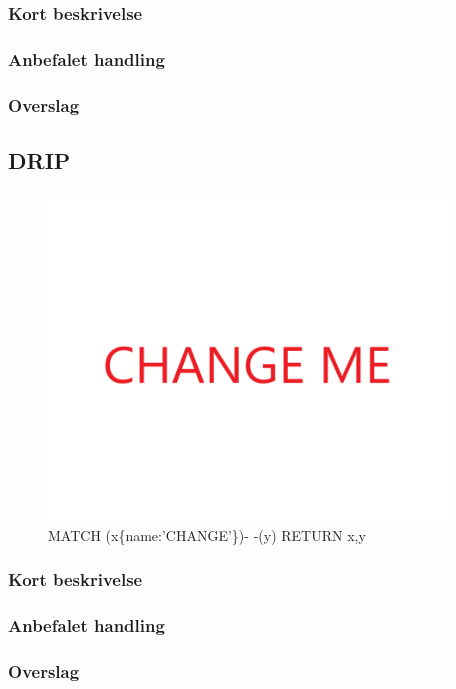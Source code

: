 \documentclass{article}
\begin{document}
\subsubsection{Kort beskrivelse}
\subsubsection{Anbefalet handling}
\subsubsection{Overslag}


\subsection{DRIP}
\begin{figure}[h]
\includegraphics[width=300pt]{CHANGE.PNG}
\caption{MATCH (x\{name:'CHANGE'\})- -(y) RETURN x,y}
\end{figure}
\subsubsection{Kort beskrivelse}
\subsubsection{Anbefalet handling}
\subsubsection{Overslag}
\end{document}
